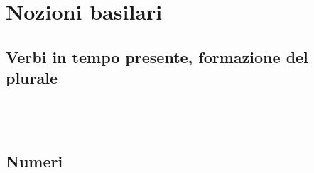 \documentclass{book}
\title{\q{   }}
\author{Thorsten Renk \and Giovanni Lovato \\ \q{}}
\newcommand{\quetta}[1]{{\formal #1}}
\newcommand{\q}[1]{\quetta{#1}}
\begin{document}
\frontmatter
\maketitle
\tableofcontents

\mainmatter
\part{Nozioni basilari}
\chapter{Verbi in tempo presente, formazione del plurale}



\appendix
\chapter{\q{}}


\chapter{Numeri}


\backmatter
\end{document}
